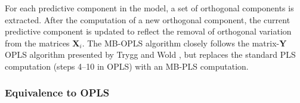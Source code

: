 \begin{doublespace}
For each predictive component in the model, a set of orthogonal components is
extracted. After the computation of a new orthogonal component, the current
predictive component is updated to reflect the removal of orthogonal variation
from the matrices $\mathbf{X}_i$. The MB-OPLS algorithm closely follows the
matrix-$\mathbf{Y}$ OPLS algorithm presented by Trygg and Wold
\cite{trygg:jchemo2002}, but replaces the standard PLS computation
(steps 4--10 in OPLS) with an MB-PLS computation.
\end{doublespace}

\subsubsection{Equivalence to OPLS}

